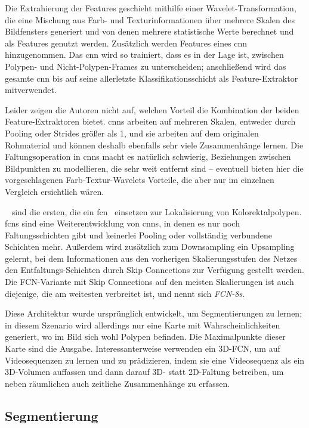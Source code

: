 Die Extrahierung der Features geschieht mithilfe einer Wavelet-Transformation, die eine Mischung aus Farb- und Texturinformationen über mehrere Skalen des Bildfensters generiert und von denen mehrere statistische Werte berechnet und als Features genutzt werden.
Zusätzlich werden Features eines \gls{cnn} hinzugenommen.
Das \gls{cnn} wird so trainiert, dass es in der Lage ist, zwischen Polypen- und Nicht-Polypen-Frames zu unterscheiden; anschließend wird das gesamte \gls{cnn} bis auf seine allerletzte Klassifikationsschicht als Feature-Extraktor mitverwendet.

Leider zeigen die Autoren nicht auf, welchen Vorteil die Kombination der beiden Feature-Extraktoren bietet.
\glspl{cnn} arbeiten auf mehreren Skalen, entweder durch Pooling oder Strides größer als 1, und sie arbeiten auf dem originalen Rohmaterial und können deshalb ebenfalls sehr viele Zusammenhänge lernen.
Die Faltungsoperation in \glspl{cnn} macht es natürlich schwierig, Beziehungen zwischen Bildpunkten zu modellieren, die sehr weit entfernt sind -- eventuell bieten hier die vorgeschlagenen Farb-Textur-Wavelets Vorteile, die aber nur im einzelnen Vergleich ersichtlich wären.

\citeauthor{Lequan.2017}~\cite{Lequan.2017} sind die ersten, die ein \gls{fcn}~\cite{Long.2015} einsetzen zur Lokalisierung von Kolorektalpolypen.
\glspl{fcn} sind eine Weiterentwicklung von \glspl{cnn}, in denen es nur noch Faltungsschichten gibt und keinerlei Pooling oder vollständig verbundene Schichten mehr.
Außerdem wird zusätzlich zum Downsampling ein Upsampling gelernt, bei dem Informationen aus den vorherigen Skalierungsstufen des Netzes den Entfaltungs-Schichten durch Skip Connections zur Verfügung gestellt werden.
Die FCN-Variante mit Skip Connections auf den meisten Skalierungen ist auch diejenige, die am weitesten verbreitet ist, und nennt sich \emph{FCN-8s}.

Diese Architektur wurde ursprünglich entwickelt, um Segmentierungen zu lernen; in diesem Szenario wird allerdings nur eine Karte mit Wahrscheinlichkeiten generiert, wo im Bild sich wohl Polypen befinden.
Die Maximalpunkte dieser Karte sind die Ausgabe.
Interessanterweise verwenden \citeauthor{Lequan.2017} ein 3D-FCN, um auf Videosequenzen zu lernen und zu prädizieren, indem sie eine Videosequenz als ein 3D-Volumen auffassen und dann darauf 3D- statt 2D-Faltung betreiben, um neben räumlichen auch zeitliche Zusammenhänge zu erfassen.



\subsection{Segmentierung}

